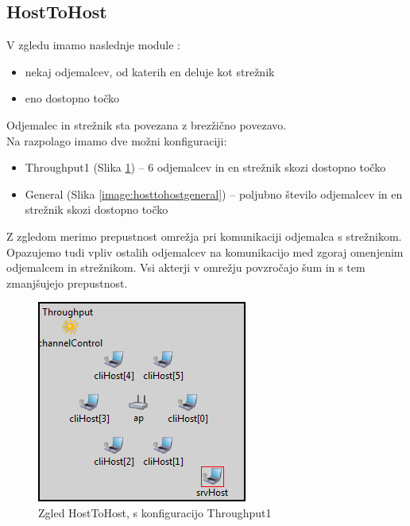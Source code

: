\documentclass[a4paper,11pt]{article}
\begin{document}
\subsection{HostToHost}
V zgledu imamo naslednje module :

\begin{itemize}
    \item nekaj odjemalcev, od katerih en deluje kot strežnik
    \item eno dostopno točko
\end{itemize}

Odjemalec in strežnik sta povezana z brezžično povezavo.\\

Na razpolago imamo dve možni konfiguraciji:

\begin{itemize}
    \item Throughput1 (Slika \ref{image:hosttohost}) – 6 odjemalcev in en strežnik skozi dostopno točko
    \item General (Slika \ref{image:hosttohostgeneral}) – poljubno število odjemalcev in en strežnik skozi dostopno točko
\end{itemize}

Z zgledom merimo prepustnost omrežja pri komunikaciji odjemalca s strežnikom. Opazujemo tudi vpliv ostalih odjemalcev na komunikacijo med zgoraj omenjenim odjemalcem in strežnikom. Vsi akterji v omrežju povzročajo šum in s tem zmanjšujejo prepustnost.


\begin{figure}[htbp]
    \begin{center}
        \includegraphics[scale=0.8]{img/zgledi/hosttohost.png}
        \caption{Zgled HostToHost, s konfiguracijo Throughput1}
        \label{image:hosttohost}
    \end{center}
\end{figure}
\end{document}
